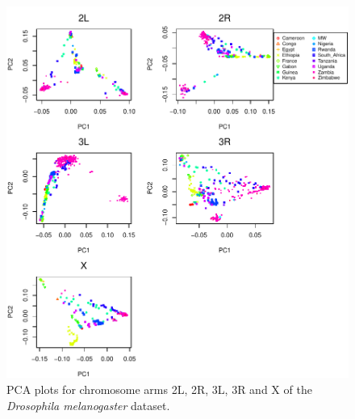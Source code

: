 \documentclass[11pt, oneside]{article}   	%
\begin{document}
\begin{figure}
    \begin{center}
       \includegraphics[width=1\textwidth]{FigS_pca_plots_allchr_drosophila}
    \end{center}
    \caption{
        PCA plots for chromosome arms 2L, 2R, 3L, 3R and X of the \textit{Drosophila melanogaster} dataset.
        \label{sfig:pca_drosophila_allchr}
    }
\end{figure}
\end{document}
